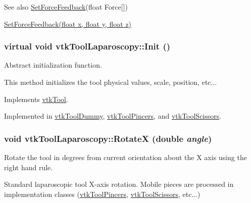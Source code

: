 \begin{DoxySeeAlso}{See also}
\hyperlink{classvtkToolLaparoscopy_a9bbfa040ca224472e6c669a3c27d9977}{SetForceFeedback}(float Force\mbox{[}\mbox{]}) 

\hyperlink{classvtkToolLaparoscopy_aa716d470104640646068eaa160a7adf2}{SetForceFeedback(float x, float y, float z)} 
\end{DoxySeeAlso}
\hypertarget{classvtkToolLaparoscopy_ace75ea21a3ddb27547976ddea0ebb60e}{
\subsubsection[{Init}]{\setlength{\rightskip}{0pt plus 5cm}virtual void vtkToolLaparoscopy::Init ()}}
\label{classvtkToolLaparoscopy_ace75ea21a3ddb27547976ddea0ebb60e}


Abstract initialization function. 

This method initializes the tool physical values, scale, position, etc... 

Implements \hyperlink{classvtkTool_a6b9e7743cde1b61b252abef17248a913}{vtkTool}.



Implemented in \hyperlink{classvtkToolDummy_aaf4c69a9c0fc3432e678ca9fffc913dc}{vtkToolDummy}, \hyperlink{classvtkToolPincers_ae4918610073324c94dddd8da234742a9}{vtkToolPincers}, and \hyperlink{classvtkToolScissors_a5fc5884ce0fd1723ecf86888bdbba7a6}{vtkToolScissors}.

\hypertarget{classvtkToolLaparoscopy_a6894dddee203102828358697e8214974}{
\subsubsection[{RotateX}]{\setlength{\rightskip}{0pt plus 5cm}void vtkToolLaparoscopy::RotateX (double {\em angle})}}
\label{classvtkToolLaparoscopy_a6894dddee203102828358697e8214974}


Rotate the tool in degrees from current orientation about the X axis using the right hand rule. 

Standard laparoscopic tool X-\/axis rotation. Mobile pieces are processed in implementation classes (\hyperlink{classvtkToolPincers}{vtkToolPincers}, \hyperlink{classvtkToolScissors}{vtkToolScissors}, etc...) 

